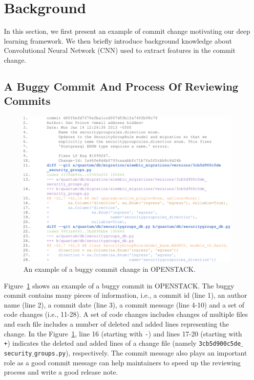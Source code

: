 

\section{Background}
\label{sec:background}

In this section, we first present an example of commit change motivating our deep learning framework. We then briefly introduce background knowledge about Convolutional Neural Network (CNN) used to extract features in the commit change. 

\subsection{A Buggy Commit And Process Of Reviewing Commits}
\label{sec:examle}

\begin{figure}[t!]
\center
\includegraphics[scale=0.2]{figs/example.pdf}
\caption{An example of a buggy commit change in OPENSTACK.}
\label{fig:example}
\end{figure} 

Figure~\ref{fig:example} shows an example of a buggy commit in OPENSTACK. The buggy commit contains many pieces of information, i.e., a commit id (line 1), an author name (line 2), a commit date (line 3), a commit message (line 4-10) and a set of code changes (i.e., 11-28). A set of code changes includes changes of multiple files and each file includes a number of deleted and added lines representing the change. In the Figure~\ref{fig:example}, line 16 (starting with \texttt{-}) and lines 17-20 (starting with \texttt{+}) indicates the deleted and added lines of a change file (namely \texttt{3cb5d900c5de$\_$security$\_$groups.py}), respectively. The commit message also plays an important role as a good commit message can help maintainers to speed up the reviewing process and write a good release note.

